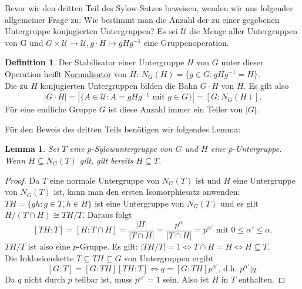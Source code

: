 \documentclass[12pt]{scrartcl}%
\newtheorem{lemma}{Lemma}
\theoremstyle{definition}
\newtheorem*{defn}{Definition}
\theoremstyle{remark}
\begin{document}
Bevor wir den dritten Teil des Sylow-Satzes beweisen, wenden wir uns folgender allgemeiner Frage zu: Wie bestimmt man die Anzahl der zu einer gegebenen Untergruppe konjugierten Untergruppen? Es sei $\mathcal{U}$ die Menge aller Untergruppen von G und $ G \times \mathcal{U} \rightarrow \mathcal{U}, g \cdot H \mapsto gHg^{-1} $ eine Gruppenoperation.

\begin{defn}
	Der Stabilisator einer Untergruppe $H$ von $G$ unter dieser Operation heißt \underline{Normalisator} von $H$: $N_G(H) = \{ g \in G: gHg^{-1} = H \}$. \\
	Die zu $H$ konjugierten Untergruppen bilden die Bahn $G \cdot H$ von $H$. Es gilt also
	$$ |G \cdot H| = | \{ A \in \mathcal{U} : A = gHg^{-1} \text{ mit } g \in G \} | = [G:N_G(H)] .$$
	Für eine endliche Gruppe $G$ ist diese Anzahl immer ein Teiler von $|G|$.
\end{defn}

Für den Beweis des dritten Teils benötigen wir folgendes Lemma:

\begin{lemma}\label{lem:Sylow}
	Sei $T$ eine $p$-Sylowuntergruppe von $G$ und $H$ eine $p$-Untergruppe. Wenn $H \subseteq N_G(T)$ gilt, gilt bereits $H \subseteq T$.
\end{lemma}

\begin{proof}
	Da $T$ eine normale Untergruppe von $N_G(T)$ ist und $H$ eine Untergruppe von $N_G(T)$ ist, kann man den ersten Isomorphiesatz anwenden: $TH = \{ gh : g \in T, h \in H \}$ ist eine Untergruppe von $N_G(T)$ und es gilt $H/(T \cap H) \cong TH/T$. Daraus folgt
	$$ [TH : T] = [H : T \cap H] = \frac{|H|}{|T \cap H|} = \frac{p^{\alpha}}{|T \cap H|} = p^{\alpha '} \text{ mit } 0 \leq \alpha ' \leq \alpha.$$
	$TH/T$ ist also eine $p$-Gruppe. Es gilt: $|TH/T| = 1 \Leftrightarrow T \cap H = H \Leftrightarrow H \subseteq T$. \\
	Die Inklusionskette $T \subseteq TH \subseteq G$ von Untergruppen ergibt
	$$[G:T] = [G:TH][TH:T] \Leftrightarrow q = [G:TH]p^{\alpha '} \text{, d.h. } p^{\alpha '} | q.$$
	Da $q$ nicht durch $p$ teilbar ist, muss $p^{\alpha '} = 1$ sein. Also ist $H$ in $T$ enthalten.
\end{proof}
\end{document}
